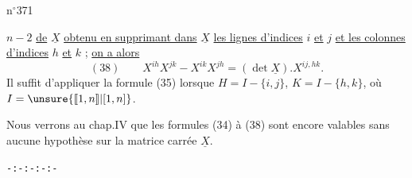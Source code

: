 
\hfill n$^\circ$371

$n-2$ \uline{de} $\underline X$ \uline{obtenu en supprimant dans} $\underline X$ \uline{les lignes d'indices} $i$ \uline{et} $j$ \uline{et les colonnes
d'indices} $h$ \uline{et} $k$ ; \uline{on a alors}
\[
(38)\qquad X^{ih}X^{jk}-X^{ik}X^{jh}=(\det\underline X).X^{ij,hk}.
\]
Il suffit d'appliquer la formule (35) lorsque $H=I-\{i,j\}$, $K=I-\{h,k\}$,
où $I=\unsure{[\![1,n]\!]|[1,n]}$.

Nous verrons au chap.IV que les formules (34) à (38) sont encore
valables sans aucune hypothèse sur la matrice carrée $\underline X$.

\begin{center}\texttt{-:-:-:-:-}\end{center}

